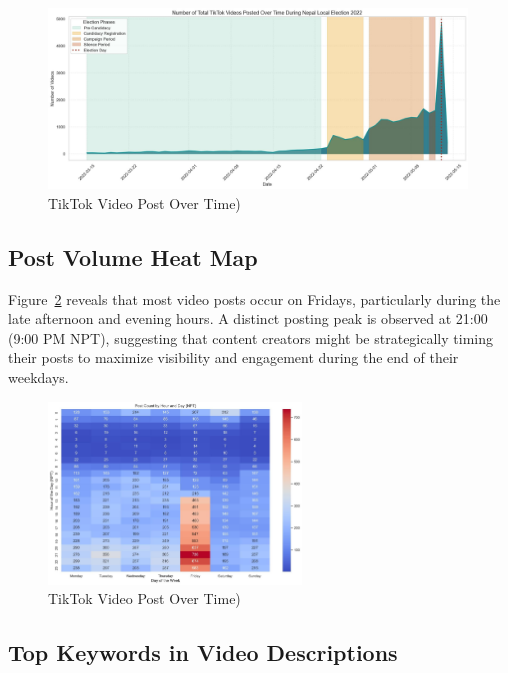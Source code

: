 \documentclass[12pt,a4paper]{report}
\begin{document}
\begin{figure}[htbp]
    \centering
    \includegraphics[width=0.99\textwidth]{figures/EDA/tiktok_video_counts_election_period.jpg}
    \caption{TikTok Video Post Over Time)}
    \label{fig:tiktok_video_post}
\end{figure}
\newpage
\subsection{Post Volume Heat Map}

Figure~\ref{fig:tiktok_heatmap_postcount} reveals that most video posts occur on Fridays, particularly during the late afternoon and evening hours. A distinct posting peak is observed at 21:00 (9:00 PM NPT), suggesting that content creators might be strategically timing their posts to maximize visibility and engagement during the end of their weekdays. 

\begin{figure}[htbp]
    \centering
    \includegraphics[width=0.60\textwidth]{figures/EDA/heatmap_post_count.jpg}
    \caption{TikTok Video Post Over Time)}
    \label{fig:tiktok_heatmap_postcount}
\end{figure}


\subsection{Top Keywords in Video Descriptions}
\end{document}
